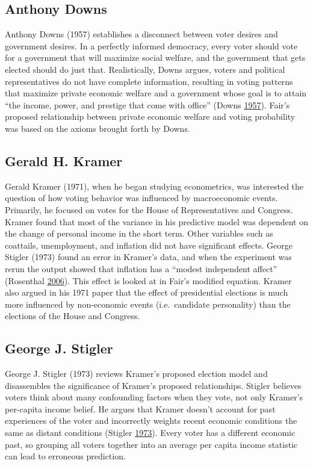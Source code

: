 \documentclass[11,]{article}
\begin{document}
\hypertarget{anthony-downs}{%
\subsection{Anthony Downs}\label{anthony-downs}}

Anthony Downs (1957) establishes a disconnect between voter desires and
government desires. In a perfectly informed democracy, every voter
should vote for a government that will maximize social welfare, and the
government that gets elected should do just that. Realistically, Downs
argues, voters and political representatives do not have complete
information, resulting in voting patterns that maximize private economic
welfare and a government whose goal is to attain ``the income, power,
and prestige that come with office'' (Downs
\protect\hyperlink{ref-downs_economic}{1957}). Fair's proposed
relationship between private economic welfare and voting probability was
based on the axioms brought forth by Downs.

\hypertarget{gerald-h.-kramer}{%
\subsection{Gerald H. Kramer}\label{gerald-h.-kramer}}

Gerald Kramer (1971), when he began studying econometrics, was
interested the question of how voting behavior was influenced by
macroeconomic events. Primarily, he focused on votes for the House of
Representatives and Congress. Kramer found that most of the variance in
his predictive model was dependent on the change of personal income in
the short term. Other variables such as coattails, unemployment, and
inflation did not have significant effects. George Stigler (1973) found
an error in Kramer's data, and when the experiment was rerun the output
showed that inflation has a ``modest independent affect'' (Rosenthal
\protect\hyperlink{ref-rosenthal_gerald_2006}{2006}). This effect is
looked at in Fair's modified equation. Kramer also argued in his 1971
paper that the effect of presidential elections is much more influenced
by non-economic events (i.e.~candidate personality) than the elections
of the House and Congress.

\hypertarget{george-j.-stigler}{%
\subsection{George J. Stigler}\label{george-j.-stigler}}

George J. Stigler (1973) reviews Kramer's proposed election model and
disassembles the significance of Kramer's proposed relationships.
Stigler believes voters think about many confounding factors when they
vote, not only Kramer's per-capita income belief. He argues that Kramer
doesn't account for past experiences of the voter and incorrectly
weights recent economic conditions the same as distant conditions
(Stigler \protect\hyperlink{ref-stigler_general_1973}{1973}). Every
voter has a different economic past, so grouping all voters together
into an average per capita income statistic can lead to erroneous
prediction.
\end{document}
